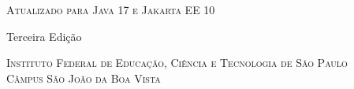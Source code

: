 {
    \thispagestyle{empty}
    
    \center
    
    \vspace*{4.5cm}
    \noindent
    \chaptitlefont\HUGE\textsc{\thetitle}
    
    {\chaptitlefont\large\textsc{Atualizado para Java 17 e Jakarta EE 10}}
    
    {\normalsize Terceira Edição}
    
    \vspace{4.5cm}
    \noindent
    \chaptitlefont\Large\textsc{\theauthor}
    
    \chaptitlefont\tiny\textsc{Instituto Federal de Educação, Ciência e Tecnologia de São Paulo}\\
    \chaptitlefont\tiny\textsc{Câmpus São João da Boa Vista}
        
    \vfill
    \restoregeometry
}